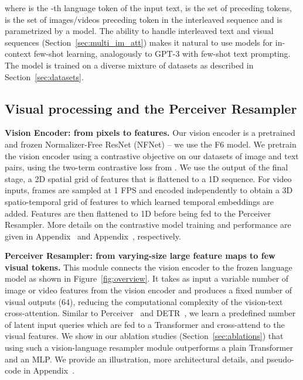 where  is the -th language token of the input text,  is the set of preceding tokens,  is the set of images/videos preceding token  in the interleaved sequence and  is parametrized by a \method{} model.
The ability to handle interleaved text and visual sequences (Section~\ref{sec:multi_im_att}) makes it natural to use \method{} models for in-context few-shot learning, analogously to GPT-3 with few-shot text prompting.
The model is trained on a diverse mixture of datasets as described in Section~\ref{sec:datasets}.





\subsection{Visual processing and the Perceiver Resampler}
\label{sec:transformer_resampler}

\noindent
\textbf{Vision Encoder: from pixels to features.}
Our vision encoder is a pretrained and frozen Normalizer-Free ResNet (NFNet) \citep{nfnets} -- we use the F6 model.
We pretrain the vision encoder using a contrastive objective on our datasets of image and text pairs, using the two-term contrastive loss from \citet{clip}.
We use the output of the final stage, a 2D spatial grid of features that is flattened to a 1D sequence.
For video inputs, frames are sampled at 1 FPS and encoded independently to obtain a 3D spatio-temporal grid of features to which learned temporal embeddings are added.
Features are then flattened to 1D before being fed to the Perceiver Resampler.
More details on the contrastive model training and performance are given in Appendix~ and Appendix~, respectively.

\noindent
\textbf{Perceiver Resampler: from varying-size large feature maps to few visual tokens.} 
This module connects the vision encoder to the frozen language model as shown in Figure~\ref{fig:overview}.
It takes as input a variable number of image or video features from the vision encoder and produces a fixed number of visual outputs (64),
reducing the computational complexity of the vision-text cross-attention.
Similar to Perceiver~\citep{jaegle2021perceiver} and DETR~\citep{carion2020end}, we learn a predefined number of latent input queries
which are fed to a Transformer and cross-attend to the visual features.
We show in our ablation studies (Section~\ref{sec:ablations}) that using such a vision-language resampler module outperforms a plain Transformer and an MLP.
We provide an illustration, more architectural details, and pseudo-code in Appendix~.


